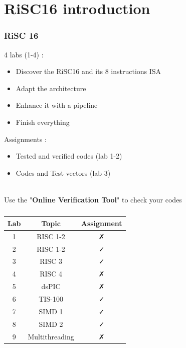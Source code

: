 \documentclass[11pt,a4paper,compress]{beamer}%
\begin{document}
\section{RiSC16 introduction}
\begin{frame}
\frametitle{ RiSC 16}
4 labs (1-4) :
\begin{itemize}
\item Discover the RiSC16 and its 8 instructions ISA
\item Adapt the architecture
\item Enhance it with a pipeline
\item Finish everything
\end{itemize}

Assignments :
\begin{itemize}
\item Tested and verified codes (lab 1-2)
\item Codes and Test vectors (lab 3)
\end{itemize}

~\\Use the "\textbf{Online Verification Tool}" to check your codes

\end{frame}


\begin{frame}
\frametitle{}
	\begin{center}
		\begin{tabular}{|c|c|c|} \hline
		Lab & Topic & Assignment \\ \hline
		1 & RISC 1-2 & \faClose \\ \hline
		2 & RISC 1-2 & {\color{green}\faCheck} \\ \hline
		3 & RISC 3 & {\color{green}\faCheck} \\ \hline
		4 & RISC 4 & \faClose \\ \hline
		5 & dsPIC & \faClose \\ \hline
		6 & TIS-100 & {\color{green}\faCheck} \\ \hline
		7 & SIMD 1 & {\color{green}\faCheck} \\ \hline
		8 & SIMD 2 & {\color{green}\faCheck} \\ \hline
		9 & Multithreading & \faClose \\ \hline
		\end{tabular}
	\end{center}

\end{frame}
\end{document}
